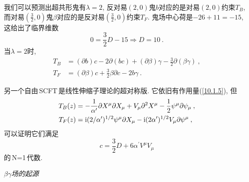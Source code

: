 我们可以预测出超共形鬼有$\lambda=2$, 反对易$(2,0)$鬼$ b $对应的是对易$(2,0)$约束$T_{B}$, 而对易$(\frac{3}{2},0)$鬼$ \beta $对应的是反对易$(\frac{3}{2},0)$约束$T_{F}$. 鬼场中心荷是$-26+11=-15$, 这给出了临界维数
\begin{equation}
    0=\frac{3}{2}D-15 \Rightarrow D=10\:.\label{10.1.20}
\end{equation}
当$\lambda=2$时,
\begin{subequations}
\begin{align}
    T_{B}&=(\partial b)c-2\partial(bc)+(\partial \beta)\gamma-\frac{3}{2}\partial(\beta\gamma)\:,
    \label{10.1.21a} \\
    T_{F}&=(\partial \beta)c+ \frac{3}{2}\beta\partial c - 2b\gamma\:.\label{10.1.21b}
\end{align}
\end{subequations}
 
另一个自由\,SCFT\,是线性伸缩子理论的超对称版. 它依旧有作用量(\ref{10.1.5}), 但
\begin{subequations}
    \begin{align}
        T_{B}(z)&=-\frac{1}{\alpha^{\prime}} \partial X^{\mu}\partial X_{\mu} +V_{\mu}\partial^{2}X^{\mu} -\frac{1}{2}\psi^{\mu}\partial\psi_{\mu} \:,\label{10.1.22a} \\
        T_{F}(z)&= \mathrm{i}(2/\alpha^{\prime})^{1/2}\psi^{\mu}\partial X_{\mu}-\mathrm{i} (2\alpha^{\prime})^{1/2}V_{\mu}\partial\psi^{\mu} \:, \label{10.1.22b} 
    \end{align} \label{10.1.22}
\end{subequations}
可以证明它们满足
\begin{equation}
    c=\frac{3}{2}D+6\alpha^{\prime} V^{\mu}V_{\mu}  \label{10.1.23}
\end{equation}
的\,N=1\,代数.

{\Large{\emph{{$\beta\gamma$场的起源}}}}\\

